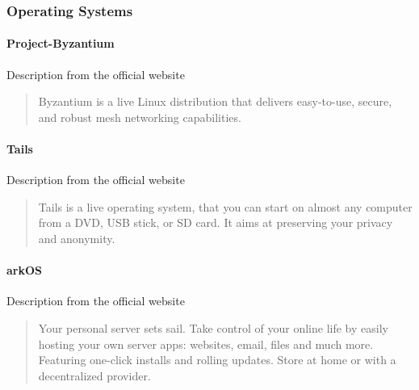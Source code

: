 
\subsubsection{Operating Systems}

\paragraph{Project-Byzantium}
Description from the official website \cite{HacDCByzantium}
\blockquote{Byzantium is a live Linux distribution that delivers easy-to-use, secure, and robust mesh networking capabilities.}

\paragraph{Tails}
Description from the official website \cite{BoumPrivacyAnywhere}
\blockquote{Tails is a live operating system, that you can start on almost any computer from a DVD, USB stick, or SD card. It aims at preserving your privacy and anonymity.}

\paragraph{arkOS}
Description from the official website \cite{ArkOSArkOS}
\blockquote{Your personal server sets sail.
Take control of your online life by easily hosting your own server apps: websites, email, files and much more. Featuring one-click installs and rolling updates. Store at home or with a decentralized provider.}

